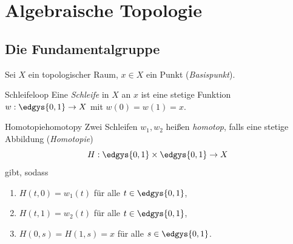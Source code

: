 \documentclass[language=ngerman]{TemplateLecture} %
\begin{document}
\part{Algebraische Topologie}
\chapter{Die Fundamentalgruppe}

Sei $X$ ein topologischer Raum, $x \in X$ ein Punkt (\emph{Basispunkt}).

\begin{defi}{Schleife}{loop}
    Eine \emph{Schleife} in $X$ an $x$ ist eine stetige Funktion $w: \edgys{0,1} \to X$ mit $w(0) = w(1) = x$.
\end{defi}

\begin{defi}{Homotopie}{homotopy}
    Zwei Schleifen $w_1, w_2$ heißen \emph{homotop}, falls eine stetige Abbildung (\emph{Homotopie})
    \begin{equation*}
        H: \edgys{0,1} \times \edgys{0,1} \to X
    \end{equation*}
    gibt, sodass 
    \begin{enumerate}[$(i)$]
        \item $H(t, 0) = w_1(t)$ für alle $t \in \edgys{0,1}$,
        \item $H(t, 1) = w_2(t)$ für alle $t \in \edgys{0,1}$,
        \item $H(0, s) = H(1, s) = x$ für alle $s \in \edgys{0,1}$.
    \end{enumerate}
\end{defi}
\end{document}
